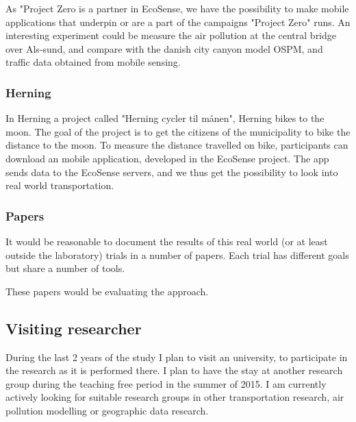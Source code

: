 As "Project Zero is a partner in EcoSense, we have the possibility to make mobile applications that underpin or are a part of the campaigns "Project Zero" runs. An interesting experiment could be measure the air pollution at the central bridge over Als-sund, and compare with the danish city canyon model OSPM, and traffic data obtained from mobile sensing.

\subsubsection{Herning}
In Herning a project called "Herning cycler til m\aa nen", Herning bikes to the moon. The goal of the project is to get the citizens of the municipality to bike the distance to the moon. To measure the distance travelled on bike, participants can download an mobile application, developed in the EcoSense project. The app sends data to the EcoSense servers, and we thus get the possibility to look into real world transportation.



\subsubsection{Papers}
It would be reasonable to document the results of this real world (or at least outside the laboratory) trials in a number of papers. Each trial has different goals but share a number of tools.

These papers would be evaluating the approach.
\subsection{Visiting researcher}
During the last 2 years of the study I plan to visit an university, to participate in the research as it is performed there. I plan to have the stay at another research group during the teaching free period in the summer of 2015. I am currently actively looking for suitable research groups in other transportation research, air pollution modelling or geographic data research.

